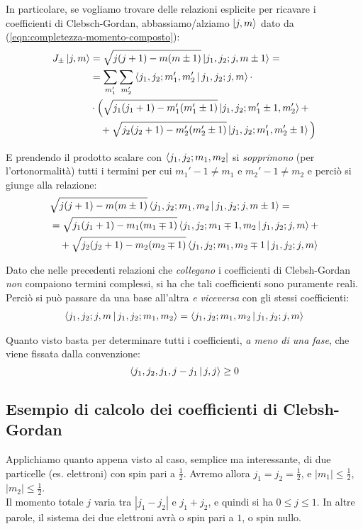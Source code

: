 \documentclass[../../FisicaTeorica.tex]{subfiles}
\begin{document}
In particolare, se vogliamo trovare delle relazioni esplicite per ricavare i coefficienti di Clebsch-Gordan, abbassiamo/alziamo $\Ket{j,m}$ dato da (\ref{eqn:completezza-momento-composto}):
\begin{align}\nonumber
J_{\pm}\Ket{j,m}&=\sqrt{j(j+1)-m(m\pm1)}\Ket{j_1, j_2; j, m\pm 1} =\\
&=\sum_{m_1'}\sum_{m_2'} \Braket{j_1, j_2;m_1',m_2'|j_1, j_2; j,m}\cdot\\ \nonumber
&\cdot \Big ( \sqrt{j_1(j_1+1)-m_1'(m_1'\pm1)}\Ket{j_1, j_2; m_1' \pm1, m_2'} +\\
&\quad +\sqrt{j_2(j_2+1)-m_2'(m_2'\pm1)}\Ket{j_1, j_2; m_1', m_2' \pm1}\Big)
\label{eqn:ricorsione_generale}
\end{align}

E prendendo il prodotto scalare con $\Bra{j_1, j_2; m_1, m_2}$ si \textit{sopprimono} (per l'ortonormalità) tutti i termini per cui $m_1'-1 \neq m_1$ e $m_2'-1\neq m_2$ e perciò si giunge alla relazione:
\begin{align}\nonumber
&\sqrt{j(j+1)-m(m\pm1)}\Braket{j_1, j_2; m_1, m_2|j_1, j_2; j, m \pm1} =\\ \nonumber
&= \sqrt{j_1(j_1+1)-m_1(m_1\mp1)}\Braket{j_1, j_2; m_1 \mp 1, m_2|j_1, j_2; j, m} +\\
&\quad+\sqrt{j_2(j_2+1)-m_2(m_2\mp1)}\Braket{j_1, j_2; m_1, m_2\mp1|j_1, j_2; j,m}
\label{eqn:recursione-coefficienti}
\end{align}

Dato che nelle precedenti relazioni che \textit{collegano} i coefficienti di Clebsh-Gordan \textit{non} compaiono termini complessi, si ha che tali coefficienti sono puramente reali. Perciò si può passare da una base all'altra \textit{e viceversa} con gli stessi coefficienti:
\begin{align*}
\Braket{j_1, j_2; j,m | j_1, j_2; m_1, m_2} = \Braket{j_1, j_2; m_1, m_2| j_1, j_2; j, m}
\end{align*}

Quanto visto basta per determinare tutti i coefficienti, \textit{a meno di una fase}, che viene fissata dalla convenzione:
\[
\Braket{j_1, j_2, j_1, j-j_1 | j ,j} \geq 0
\]

\subsection{Esempio di calcolo dei coefficienti di Clebsh-Gordan}
Applichiamo quanto appena visto al caso, semplice ma interessante, di due particelle (es. elettroni) con spin pari a $\frac{1}{2}$. Avremo allora $j_1 = j_2 = \frac{1}{2}$, e $|m_1|\leq \frac{1}{2}$, $|m_2|\leq \frac{1}{2}$.\\
Il momento totale $j$ varia tra $|j_1-j_2|$ e $j_1+j_2$, e quindi si ha $0\leq j \leq 1$. In altre parole, il sistema dei due elettroni avrà o spin pari a $1$, o spin nullo.\\
\end{document}
